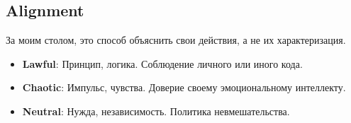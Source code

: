 \documentclass[a4paper,11pt]{book}
\let\oldtabularx\tabularx
\let\endoldtabularx\endtabularx
\renewenvironment{tabularx}{
        \AlegreyaSansOsF
        \bigskip
        \noindent
        \rowcolors{2}{}{white!94!blue}
        \oldtabularx
        } {
        \endoldtabularx
        \medskip
        }
\begin{document}
\begin{multicols}{2}
%
%
%
%

\section{Alignment}

За моим столом, это способ объяснить свои действия, а не их характеризация.

\begin{itemize}
    \item \textbf{Lawful}: Принцип, логика. Соблюдение личного или иного кода.
    \item \textbf{Chaotic}: Импульс, чувства. Доверие своему эмоциональному интеллекту.
    \item \textbf{Neutral}: Нужда, независимость. Политика невмешательства.
\end{itemize}


\end{multicols}
\end{document}
